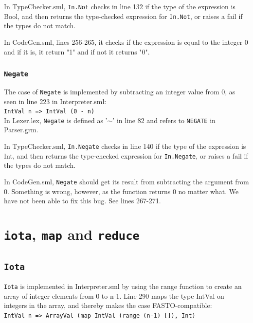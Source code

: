 \documentclass[11pt,a4paper]{article}
\theoremstyle{plain}
\theoremstyle{definition}
\theoremstyle{remark}
\numberwithin{equation}{section}
\begin{document}
	In TypeChecker.sml, \texttt{In.Not} checks in line 132 if the type of the expression is Bool, and then returns the type-checked expression for \texttt{In.Not}, or raises a fail if the types do not match.
	
	In CodeGen.sml, lines 256-265, it checks if the expression is equal to the integer 0 and if it is, it return "1" and if not it returns "0".
	
	\subsubsection{\texttt{Negate}}
	The case of \texttt{Negate} is implemented by subtracting an integer value from 0, as seen in line 223 in Interpreter.sml:\\
	\texttt{IntVal n => IntVal (0 - n)}\\
	In Lexer.lex, \texttt{Negate} is defined as '$\sim$' in line 82 and refers to \texttt{NEGATE} in Parser.grm.
	
	In TypeChecker.sml, \texttt{In.Negate} checks in line 140 if the type of the expression is Int, and then returns the type-checked expression for \texttt{In.Negate}, or raises a fail if the types do not match.
	
	In CodeGen.sml, \texttt{Negate} should get its result from subtracting the argument from 0. Something is wrong, however, as the function returns 0 no matter what. We have not been able to fix this bug. See lines 267-271.  
	
	\section{\texttt{iota}, \texttt{map} and \texttt{reduce}}
	
	\subsection{\texttt{Iota}}
	
	\texttt{Iota} is implemented in Interpreter.sml by using the range function to create an array of integer elements from 0 to n-1.
	Line 290 maps the type IntVal on integers in the array, and thereby makes the case FASTO-compatible:\\
	\texttt{IntVal n => ArrayVal (map IntVal (range (n-1) []), Int)}\\
	
\end{document}
